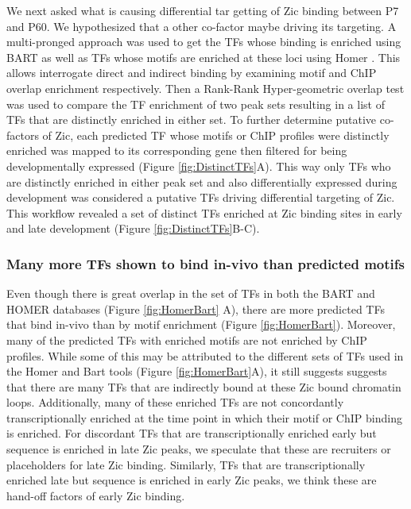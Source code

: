 \documentclass[fleqn,10pt,twocolumn]{wlscirep}
\begin{document}
We next asked what is causing differential tar getting of Zic binding between P7 and P60. We hypothesized that a other co-factor maybe driving its targeting. A multi-pronged approach was used to get the TFs whose binding is enriched using BART \cite{Zhenjiawang2018BART:Profiles, Ma2021BARTweb:Analysis} as well as TFs whose motifs are enriched at these loci using Homer \cite{}. This allows interrogate direct and indirect binding by examining motif and ChIP overlap enrichment respectively. Then a Rank-Rank Hyper-geometric overlap test was used to compare the TF enrichment of two peak sets resulting in a list of TFs that are distinctly enriched in either set. To further determine putative co-factors of Zic, each predicted TF whose motifs or ChIP profiles were distinctly enriched was mapped to its corresponding gene then filtered for being developmentally expressed  (Figure \ref{fig:DistinctTFs}A). This way only TFs who are distinctly enriched in either peak set and also differentially expressed during development was considered a putative TFs driving differential targeting of Zic. This workflow revealed a set of distinct TFs enriched at Zic binding sites in early and late development (Figure \ref{fig:DistinctTFs}B-C).

\subsubsection*{Many more TFs shown to bind in-vivo than predicted motifs} 
Even though there is great overlap in the set of TFs in both the BART and HOMER databases (Figure \ref{fig:HomerBart} A), there are more predicted TFs that bind in-vivo than by motif enrichment (Figure \ref{fig:HomerBart}). Moreover, many of the predicted TFs with enriched motifs are not enriched by ChIP profiles. While some of this may be attributed to the different sets of TFs used in the Homer and Bart tools (Figure \ref{fig:HomerBart}A), it still suggests suggests that there are many TFs that are indirectly bound at these Zic bound chromatin loops. Additionally, many of these enriched TFs are not concordantly transcriptionally enriched at the time point in which their motif or ChIP binding is enriched. For discordant TFs that are transcriptionally enriched early but sequence is enriched in late Zic peaks, we speculate that these are recruiters or placeholders for late Zic binding. Similarly, TFs that are transcriptionally enriched late but sequence is enriched in early Zic peaks, we think these are hand-off factors of early Zic binding.
\end{document}
